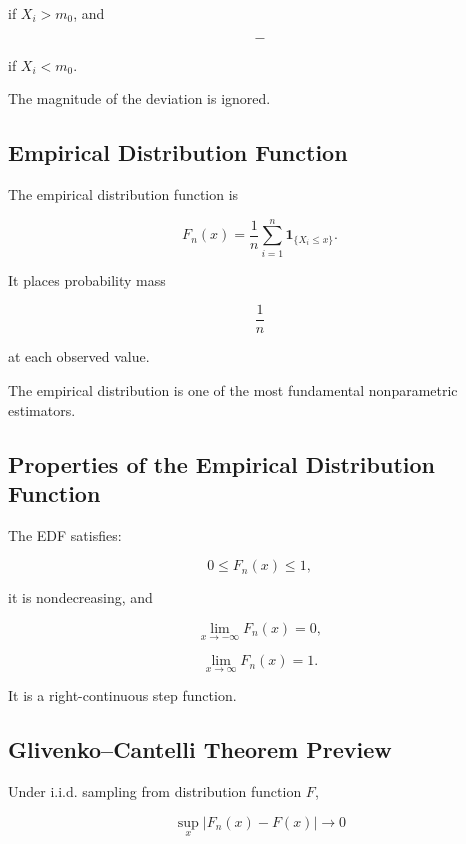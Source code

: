 if \(X_i>m_0\), and

\[
-
\]

if \(X_i<m_0\).

The magnitude of the deviation is ignored.

\subsection{Empirical Distribution Function}
\label{subsec:edf-nonparametric}

The empirical distribution function is

\[
\boxed{
F_n(x)
=
\frac1n
\sum_{i=1}^{n}
\mathbf{1}_{\{X_i\leq x\}}.
}
\]

It places probability mass

\[
\frac1n
\]

at each observed value.

The empirical distribution is one of the most fundamental nonparametric
estimators.

\subsection{Properties of the Empirical Distribution Function}
\label{subsec:edf-properties}

The EDF satisfies:

\[
\boxed{
0\leq F_n(x)\leq1,
}
\]

it is nondecreasing, and

\[
\boxed{
\lim_{x\to-\infty}F_n(x)=0,
}
\]

\[
\boxed{
\lim_{x\to\infty}F_n(x)=1.
}
\]

It is a right-continuous step function.

\subsection{Glivenko--Cantelli Theorem Preview}
\label{subsec:glivenko-cantelli-preview}

Under i.i.d. sampling from distribution function \(F\),

\[
\boxed{
\sup_x
|F_n(x)-F(x)|
\to0
}
\]

